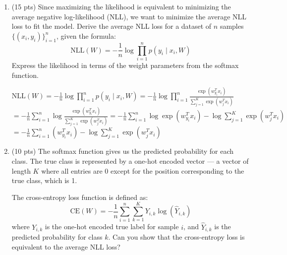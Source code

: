 \documentclass[11pt]{article}
\begin{document}
    \begin{enumerate}

\item (15 pts)
    Since maximizing the likelihood is equivalent to minimizing the average negative log-likelihood (NLL), we want to minimize the average NLL loss to fit the model. Derive the average NLL loss for a dataset of \( n \) samples \( \{(x_i, y_i)\}_{i=1}^n \), given the formula:
    \[
    \mathrm{NLL}(W) = -\frac{1}{n} \log \prod_{i=1}^n p(y_i \mid x_i, W)
    \]
    Express the likelihood in terms of the weight parameters from the softmax function.
    
    
\begin{answertext}{9cm}{}

$\mathrm{NLL}(W) = -\frac{1}{n} \log \prod_{i=1}^n p(y_i \mid x_i, W) = -\frac{1}{n} \log \prod_{i=1}^{n} \frac{\exp (w_{y_i}^T x_i)}{\sum_{j=1}^K \exp (w_j^T x_i)}$\\
$= -\frac{1}{n} \sum_{i=1}^{n} \log \frac{\exp (w_{y_i}^T x_i)}{\sum_{j=1}^K \exp (w_j^T x_i)} = -\frac{1}{n} \sum_{i=1}^{n} \log \exp (w_{y_i}^T x_i) - \log \sum_{j=1}^K \exp (w_j^T x_i)$\\
$= -\frac{1}{n} \sum_{i=1}^{n} (w_{y_i}^T x_i) - \log \sum_{j=1}^{K} \exp (w_j^T x_i)$\\

\end{answertext} 

    \item (10 pts)
    The softmax function gives us the predicted probability for each class. The true class is represented by a one-hot encoded vector — a vector of length \( K \) where all entries are 0 except for the position corresponding to the true class, which is 1. 
    
    The cross-entropy loss function is defined as: \[
\mathrm{CE}(W) = -\frac{1}{n}\sum_{i=1}^n\sum_{k=1}^K Y_{i,k} \log(\hat{Y}_{i,k})
\] where \(Y_{i,k}\) is the one-hot encoded true label for sample \(i\), and \(\hat{Y}_{i,k}\) is the predicted probability for class \(k\). Can you show that the cross-entropy loss is equivalent to the average NLL loss? 

\begin{answertext}{9cm}{}


  
\end{answertext} 

\end{enumerate}
\end{document}
